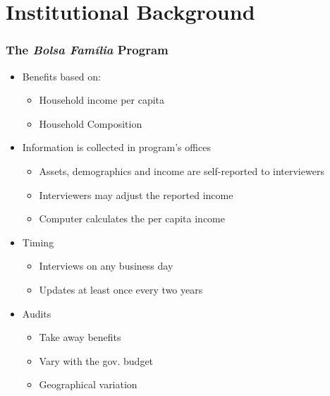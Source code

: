 \documentclass[xcolor=pdftex,dvipsnames,table]{beamer}
\begin{document}
\section{Institutional Background}

\begin{frame}
	\frametitle{The \textit{Bolsa Fam\'ilia} Program}
\begin{itemize}
\item Benefits based on: 
\begin{itemize}
\item Household income per capita
\item Household Composition
\end{itemize}
\item Information is collected in program's offices
\begin{itemize}
\item Assets, demographics and income are self-reported to interviewers
\item Interviewers may adjust the reported income
\item Computer calculates the per capita income
\end{itemize}
\item Timing
\begin{itemize}
\item Interviews on any business day
\item Updates at least once every two years
\end{itemize}
\item Audits
\begin{itemize}
\item Take away benefits
\item Vary with the gov. budget
\item Geographical variation
\end{itemize}
\end{itemize}	
\end{frame}
\end{document}
